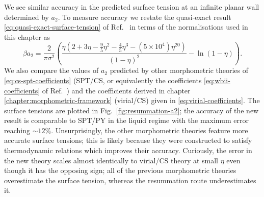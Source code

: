 \documentclass[11pt,twoside]{report}
\begin{document}
We see similar accuracy in the predicted surface tension at an infinite planar wall determined by%
$a_2$.
To measure accuracy we restate the quasi-exact result \eqref{eq:quasi-exact-surface-tension} of Ref.\ \cite{DavidchackMP2015} in terms of the normalisations used in this chapter as
\begin{equation}\label{eq:quasi-exact-surface-tension}
  \beta a_2
  =
  \frac{2}{\pi \sigma^2} \left(
  \frac{\eta (2 + 3\eta - \frac{9}{5}\eta^2 - \frac{4}{5}\eta^3 - (5 \times 10^4) \eta^{20})}{(1 - \eta)^2}
  - \ln{(1 - \eta)}
  \right).
\end{equation}
We also compare the values of $a_2$ predicted by other morphometric theories of \eqref{eq:cs-spt-coefficients} (SPT/CS, or equivalently the coefficients \eqref{eq:wbii-coefficients} of Ref.\ \cite{Hansen-GoosJPCM2006}) and the coefficients derived in chapter \ref{chapter:morphometric-framework} (virial/CS) given in \eqref{eq:virial-coefficients}.
The surface tensions are plotted in Fig.\ \ref{fig:resummation-a2}; the accuracy of the new result is comparable to SPT/PY in the liquid regime with the maximum error reaching $\sim12\%$.
Unsurprisingly, the other morphometric theories feature more accurate surface tensions; this is likely because they were constructed to satisfy thermodynamic relations which improves their accuracy.
Curiously, the error in the new theory scales almost identically to virial/CS theory at small $\eta$ even though it has the opposing sign; all of the previous morphometric theories overestimate the surface tension, whereas the resummation route underestimates it.
\end{document}
